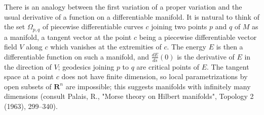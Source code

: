 \begin{remark}[Remark 2.7]
  \label{rem:dc-ch9-2-7}
  There is an analogy between the first variation of a proper variation and the usual
  derivative of a function on a differentiable manifold. It is natural to think of
  the set $\Omega_{p,q}$ of piecewise differentiable curves $c$ joining two points
  $p$ and $q$ of $M$ as a manifold, a tangent vector at the point $c$ being a
  piecewise differentiable vector field $V$ along $c$ which vanishes at the
  extremities of $c$. The energy $E$ is then a differentiable function on such a
  manifold, and $\frac{dE}{ds}(0)$ is the derivative of $E$ in the direction of $V$;
  geodesics joining $p$ to $q$ are critical points of $E$. The tangent space at a
  point $c$ does not have finite dimension, so local parametrizations by open subsets
  of $\mathbf{R}^n$ are impossible; this suggests manifolds with infinitely many
  dimensions (consult Palais, R., "Morse theory on Hilbert manifolds", Topology 2
  (1963), 299–340).
\end{remark}

